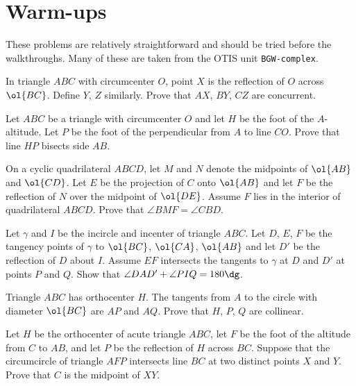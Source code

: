 \documentclass[11pt]{scrartcl}
\begin{document}
\pagebreak

\section{Warm-ups}
\label{sec:warm-ups}

These problems are relatively straightforward and should be tried before the walkthroughs. Many of these are taken from the OTIS unit \verb|BGW-complex|.

\begin{problem}
	In triangle $ABC$ with circumcenter $O$,
	point $X$ is the reflection of $O$ across $\ol{BC}$.
	Define $Y$, $Z$ similarly.
	Prove that $AX$, $BY$, $CZ$ are concurrent.
\end{problem}

\begin{problem}
	Let $ABC$ be a triangle with circumcenter $O$
	and let $H$ be the foot of the $A$-altitude.
	Let $P$ be the foot of the perpendicular from $A$ to line $CO$.
	Prove that line $HP$ bisects side $AB$.
\end{problem}

\begin{problem}
	On a cyclic quadrilateral $ABCD$, let $M$ and $N$ denote
	the midpoints of $\ol{AB}$ and $\ol{CD}$.
	Let $E$ be the projection of $C$ onto $\ol{AB}$
	and let $F$ be the reflection of $N$ over the midpoint of $\ol{DE}$.
	Assume $F$ lies in the interior of quadrilateral $ABCD$.
	Prove that $\angle BMF = \angle CBD$.
\end{problem}

\begin{problem}[PUMaC 2013]
	Let $\gamma$ and $I$ be the incircle and incenter of triangle $ABC$.
	Let $D$, $E$, $F$ be the tangency points of $\gamma$
	to $\ol{BC}$, $\ol{CA}$, $\ol{AB}$ and
	let $D'$ be the reflection of $D$ about $I$.
	Assume $EF$ intersects the tangents to $\gamma$
	at $D$ and $D'$ at points $P$ and $Q$.
	Show that $\angle DAD' + \angle PIQ = 180\dg$.
\end{problem}

\begin{problem}[China 1996]
	Triangle $ABC$ has orthocenter $H$.
	The tangents from $A$ to the circle with diameter $\ol{BC}$ are $AP$ and $AQ$.
	Prove that $H$, $P$, $Q$ are collinear.
\end{problem}

\begin{problem}[JMO 2025/5]
	Let $H$ be the orthocenter of acute triangle $ABC$, let $F$ be the foot of the altitude from $C$ to $AB$, and let $P$ be the reflection of $H$ across $BC$. Suppose that the circumcircle of triangle $AFP$ intersects line $BC$ at two distinct points $X$ and $Y$. Prove that $C$ is the midpoint of $XY$.
\end{problem}
\end{document}
